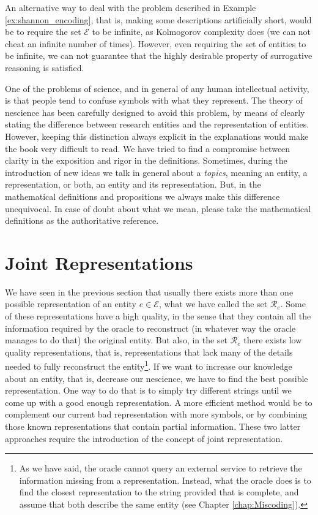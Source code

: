 An alternative way to deal with the problem described in Example \ref{ex:shannon_encoding}, that is, making some descriptions artificially short, would be to require the set $\mathcal{E}$ to be infinite, as Kolmogorov complexity does (we can not cheat an infinite number of times). However, even requiring the set of entities to be infinite, we can not guarantee that the highly desirable property of surrogative reasoning is satisfied.

One of the problems of science, and in general of any human intellectual activity, is that people tend to confuse symbols with what they represent. The theory of nescience has been carefully designed to avoid this problem, by means of clearly stating the difference between research entities and the representation of entities. However, keeping this distinction always explicit in the explanations would make the book very difficult to read. We have tried to find a compromise between clarity in the exposition and rigor in the definitions. Sometimes, during the introduction of new ideas we talk in general about a \emph{topics}, meaning an entity, a representation, or both, an entity and its representation. But, in the mathematical definitions and propositions we always make this difference unequivocal. In case of doubt about what we mean, please take the mathematical definitions as the authoritative reference. 

%
%

\section{Joint Representations}
\label{sec:descriptions_joint_topic}

We have seen in the previous section that usually there exists more than one possible representation of an entity $e \in \mathcal{E}$, what we have called the set $\mathcal{R}_e$. Some of these representations have a high quality, in the sense that they contain all the information required by the oracle to reconstruct (in whatever way the oracle manages to do that) the original entity. But also, in the set $\mathcal{R}_e$ there exists low quality representations, that is, representations that lack many of the details needed to fully reconstruct the entity\footnote{As we have said, the oracle cannot query an external service to retrieve the information missing from a representation. Instead, what the oracle does is to find the closest representation to the string provided that is complete, and assume that both describe the same entity (see Chapter \ref{chap:Miscoding}).}. If we want to increase our knowledge about an entity, that is, decrease our nescience, we have to find the best possible representation. One way to do that is to simply try different strings until we come up with a good enough representation. A more efficient method would be to complement our current bad representation with more symbols, or by combining those known representations that contain partial information. These two latter approaches require the introduction of the concept of joint representation.

